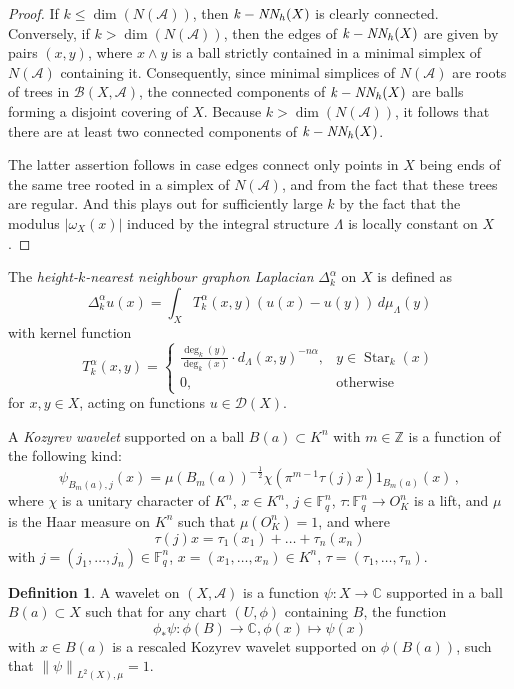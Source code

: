 \documentclass[a4paper,draft]{ZbRad}
\theoremstyle{plain}
\theoremstyle{definition}
\newtheorem{dfn}{Definition}[section]
\numberwithin{equation}{section}
\renewcommand{\le}{\leqslant}\renewcommand{\leq}{\leqslant}
\newcommand{\absolute}[1]{\left\lvert#1\right\rvert}
\newcommand{\norm}[1]{\left\|#1\right\|}
\DeclareMathOperator{\Star}{Star}
\DeclareMathOperator{\kNNh}{\it{k-NN_h}}
\begin{document}
\begin{proof}
If $k\le\dim(N(\mathcal{A}))$, then $\kNNh(X)$ is clearly connected. Conversely, if $k > \dim(N(\mathcal{A}))$, then the
edges of $\kNNh(X)$ are given by pairs
$(x,y)$, where $x\wedge y$ is a ball strictly 
contained in a minimal simplex of $N(\mathcal{A})$ containing it. Consequently, since
minimal simplices of $N(\mathcal{A})$ are roots of trees in $\mathcal{B}(X,\mathcal{A})$, the connected
components of $\kNNh(X)$ are balls forming a disjoint covering of $X$. Because 
$k > \dim(N(\mathcal{A}))$, it follows that there are at least two connected components of $\kNNh(X)$. 

\smallskip
The latter assertion follows in case edges connect only points in $X$ being ends of the same tree rooted in a simplex of $N(\mathcal{A})$, and from the fact that these trees are regular. And this plays out for sufficiently large $k$ by the fact that the modulus $\absolute{\omega_X(x)}$ induced by the integral structure $\Lambda$  is locally constant on $X$.
\end{proof}

The \emph{height-$k$-nearest neighbour graphon Laplacian} $\Delta_k^\alpha$ on $X$ is defined as
\[
\Delta_{k}^\alpha u(x)=
\int_X T_{k}^\alpha(x,y)(u(x)-u(y))\,d\mu_\Lambda(y)
\]
with kernel function
\[
T_{k}^\alpha(x,y)=\begin{cases}
\frac{\displaystyle\deg_k(y)}{\displaystyle\deg_k(x)}\cdot d_\Lambda(x,y)^{-n\alpha},&y\in\Star_{k}(x)
\\
0,&\text{otherwise}
\end{cases}
\]
for $x,y\in X$, acting on functions $u\in\mathcal{D}(X)$.
\newline

A \emph{Kozyrev wavelet} supported on a ball $B(a)\subset K^n$ with $m\in\mathbb{Z}$ is a
function of the following kind:
\[
\psi_{B_m(a),j}(x)=\mu(B_m(a))^{-\frac12}\chi(\pi^{m-1}\tau(j)x)1_{B_m(a)}(x)\,,
\]
where $\chi$ is a unitary character of $K^n$, $x\in K^n$, $j\in\mathbb{F}_q^n$, $\tau\colon\mathbb{F}_q^n\to O_K^n$ is a lift, and $\mu$ is the Haar measure on $K^n$ such that $\mu(O_K^n)=1$, and where
\[
\tau(j)x=\tau_1(x_1)+\dots+\tau_n(x_n)
\]
with $j=(j_1,\dots,j_n)\in\mathbb{F}_q^n$,
$x=(x_1,\dots,x_n)\in K^n$, $\tau=(\tau_1,\dots,\tau_n)$.

\begin{dfn}
A wavelet on $(X,\mathcal{A})$ is a function $\psi\colon X\to\mathbb{C}$ supported in
a ball $B(a)\subset X$ such that for any chart $(U, \phi)$ containing $B$, the function
\[
\phi_*\psi\colon\phi(B)\to\mathbb{C}, \phi(x)\mapsto\psi(x)
\]
with $x \in B(a)$ is a rescaled Kozyrev wavelet supported on $\phi(B(a))$,   such
that $\norm{\psi}_{L^2(X),\mu}=1$.
\end{dfn}
\end{document}
